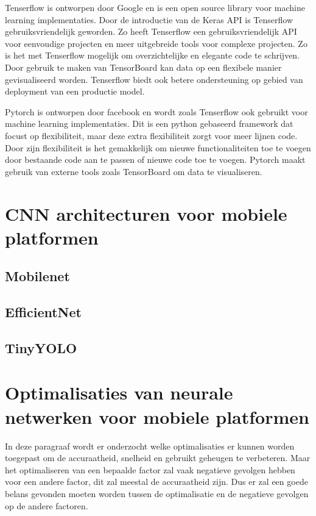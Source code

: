 Tenserflow is ontworpen door Google en is een open source library voor machine learning implementaties.
Door de introductie van de Keras API is Tenserflow gebruiksvriendelijk geworden.
Zo heeft Tenserflow een gebruiksvriendelijk API voor eenvoudige projecten en meer uitgebreide tools voor complexe projecten.
Zo is het met Tenserflow mogelijk om overzichtelijke en elegante code te schrijven.
Door gebruik te maken van TensorBoard kan data op een flexibele manier gevisualiseerd worden. 
Tenserflow biedt ook betere ondersteuning op gebied van deployment van een productie model.

Pytorch is ontworpen door facebook en wordt zoals Tenserflow ook gebruikt voor machine learning implementaties.
Dit is een python gebaseerd framework dat focust op flexibiliteit, maar deze extra flexibiliteit zorgt voor meer lijnen code.
Door zijn flexibiliteit is het gemakkelijk om nieuwe functionaliteiten toe te voegen door bestaande code aan te passen of nieuwe code toe te voegen.
Pytorch maakt gebruik van externe tools zoals TensorBoard om data te visualiseren.

\section{CNN architecturen voor mobiele platformen}

\subsection{Mobilenet}

\subsection{EfficientNet}

\subsection{TinyYOLO}

\section{Optimalisaties van neurale netwerken voor mobiele platformen}
In deze paragraaf wordt er onderzocht welke optimalisaties er kunnen worden toegepast om de accuraatheid, snelheid en gebruikt geheugen te verbeteren.
Maar het optimaliseren van een bepaalde factor zal vaak negatieve gevolgen hebben voor een andere factor, dit zal meestal de accuraatheid zijn.
Dus er zal een goede belans gevonden moeten worden tussen de optimalisatie en de negatieve gevolgen op de andere factoren.

